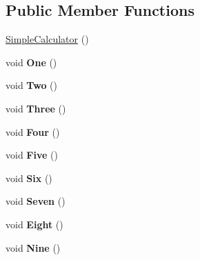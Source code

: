 \subsection*{Public Member Functions}
\begin{DoxyCompactItemize}
\item 
\hyperlink{class_simple_calculator_abc3dbc4a359f61839604243111076ad0}{Simple\+Calculator} ()
\item 
\hypertarget{class_simple_calculator_aa3bd09c9f5110a03974370f40e5730b2}{}void {\bfseries One} ()\label{class_simple_calculator_aa3bd09c9f5110a03974370f40e5730b2}

\item 
\hypertarget{class_simple_calculator_aa86e716cba419eab04d54bf6c81813ed}{}void {\bfseries Two} ()\label{class_simple_calculator_aa86e716cba419eab04d54bf6c81813ed}

\item 
\hypertarget{class_simple_calculator_a04d7cbe2f81cc153d7d3585d419748eb}{}void {\bfseries Three} ()\label{class_simple_calculator_a04d7cbe2f81cc153d7d3585d419748eb}

\item 
\hypertarget{class_simple_calculator_a9ac1a3907ac92d44023377d0092c338c}{}void {\bfseries Four} ()\label{class_simple_calculator_a9ac1a3907ac92d44023377d0092c338c}

\item 
\hypertarget{class_simple_calculator_a7f6caf82ea486dfedb07d7255086958c}{}void {\bfseries Five} ()\label{class_simple_calculator_a7f6caf82ea486dfedb07d7255086958c}

\item 
\hypertarget{class_simple_calculator_a39da478b7dc5da6ea463851de861be8b}{}void {\bfseries Six} ()\label{class_simple_calculator_a39da478b7dc5da6ea463851de861be8b}

\item 
\hypertarget{class_simple_calculator_ab7e9de1426acd6994ad9ba410171a2ab}{}void {\bfseries Seven} ()\label{class_simple_calculator_ab7e9de1426acd6994ad9ba410171a2ab}

\item 
\hypertarget{class_simple_calculator_a112c39b663a0666b47131d929fc14943}{}void {\bfseries Eight} ()\label{class_simple_calculator_a112c39b663a0666b47131d929fc14943}

\item 
\hypertarget{class_simple_calculator_a17494a987cba00cfa6af6cfecd379ee5}{}void {\bfseries Nine} ()\label{class_simple_calculator_a17494a987cba00cfa6af6cfecd379ee5}


\end{DoxyCompactItemize}
